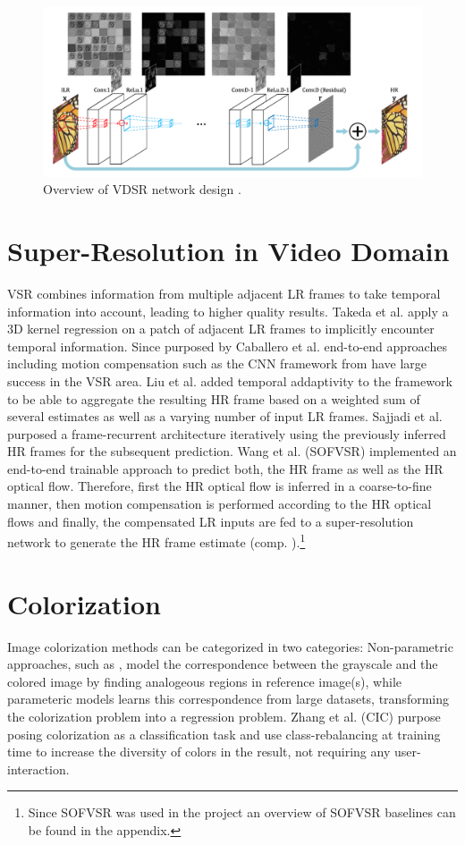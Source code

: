 \begin{figure}[!htbp]
	\centering
	\includegraphics[width=14cm]{figures/vdsr}
	\caption{Overview of VDSR network design \cite{AISRUVDCN}.}
  \label{fig:vdsr}
\end{figure}

\section{Super-Resolution in Video Domain}
\ac{VSR} combines information from multiple adjacent LR frames
to take temporal information into account, leading to higher quality results. Takeda et al. \cite{SRWESME} apply a 3D kernel regression on a patch of adjacent \ac{LR} frames to implicitly encounter temporal information. Since purposed by Caballero et al. \cite{RTVSRWSTNAMC} end-to-end approaches including motion compensation such as the CNN framework from \cite{RTVSRWSTNAMC} have large success in the VSR area. Liu et al. \cite{RVSRWLTD} added temporal addaptivity to the framework to be able to aggregate the resulting \ac{HR} frame based on a weighted
sum of several estimates as well as a varying number of input LR frames. Sajjadi et al. \cite{FRVSR} purposed a frame-recurrent architecture iteratively using the previously inferred \ac{HR} frames for the subsequent prediction. Wang et al. \cite{LFVSRTHROFE} (SOFVSR) implemented an end-to-end trainable approach to predict both, the \ac{HR} frame as well as the HR optical flow. Therefore, first the HR optical flow is inferred in a coarse-to-fine manner, then motion compensation is performed according to the HR optical flows and finally, the compensated LR inputs are fed to a super-resolution network to generate the HR frame estimate
(comp. ).\footnote{Since SOFVSR was used in the project an overview of SOFVSR baselines can be found in the appendix.}

\section{Colorization}
Image colorization methods can be categorized in two categories: Non-parametric approaches, such as \cite{ICUSI}, model the correspondence between the grayscale and the colored image by finding analogeous regions in reference image(s), while parameteric models learns this correspondence from large datasets, transforming the colorization problem into a regression problem. Zhang et al. \cite{CIC} (CIC) purpose posing colorization as a classification task and use class-rebalancing at training time to increase the diversity of colors in the result, not requiring any user-interaction.

